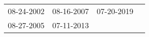 \begin{supertabular}{llll}
 08-24-2002 &  08-16-2007 &  07-20-2019 \\
 08-27-2005 &  07-11-2013 &             \\
\end{supertabular}
